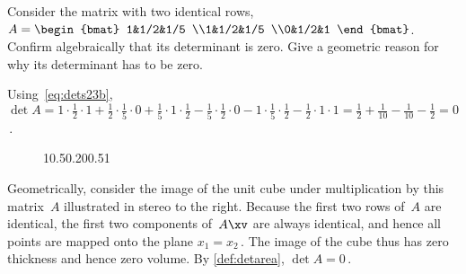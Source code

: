\begin{example} 
Consider the matrix with two identical rows,
\(A=\begin{bmat} 1&1/2&1/5
\\1&1/2&1/5
\\0&1/2&1 \end{bmat}\).
Confirm algebraically that its determinant is zero.
Give a geometric reason for why its determinant has to be zero.

\begin{solution} 
Using~\eqref{eq:dets23b}, \(\det A =1\cdot\frac12\cdot1 +\frac12\cdot\frac15\cdot0 +\frac15\cdot1\cdot\frac12
-\frac15\cdot\frac12\cdot0 -1\cdot\frac15\cdot\frac12 -\frac12\cdot1\cdot1 =\frac12+\frac1{10}-\frac1{10}-\frac12=0\)\,.

\begin{wrapfigure}{r}{0pt} 
1{0.5}{0.2}{0}{0.5}1
\end{wrapfigure}
Geometrically, consider the image of the unit cube under multiplication by this matrix~\(A\) illustrated in stereo to the right. 
Because the first two rows of~\(A\) are identical, the first two components of~\(A\xv\) are always identical, and hence all points are mapped onto the plane \(x_1=x_2\)\,.  
The image of the cube thus has zero thickness and hence zero volume.
By \cref{def:detarea}, \(\det A=0\)\,.
\aqed

\end{solution}
\end{example}




